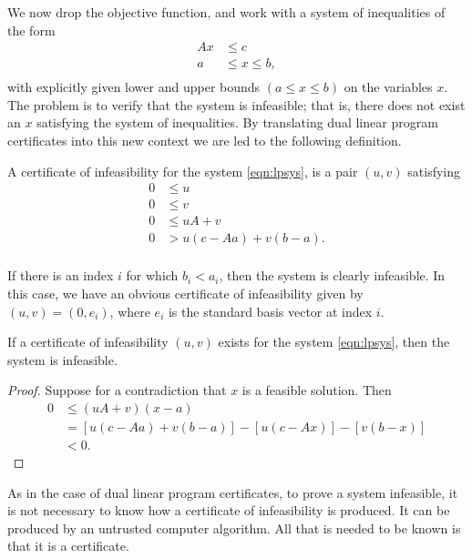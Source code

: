 We now drop the objective function, and work
with a system of inequalities  of the form
\begin{equation}
\label{eqn:lpsys}
\begin{array}{lll}
A x &\le c\\
a &\le x \le b,\\
\end{array}
\end{equation}
with explicitly given lower and upper bounds $(a\le x\le b)$ on
the variables $x$.  The problem
is to verify that the system is infeasible; that is, there does
not exist an $x$ satisfying the system of inequalities.  By
translating dual linear program certificates into this new context
we are led to the following definition.

\begin{definition}
A certificate of infeasibility for the system \ref{eqn:lpsys},
is a pair $(u,v)$ satisfying
$$
\begin{array}{lll}
0&\le u\\
0&\le v\\
0&\le u A + v\\
0& > u(c-Aa) + v(b-a). \\
\end{array}
$$
\end{definition}

\begin{example}
If there is an index $i$ for which $b_i < a_i$, then the system is
clearly infeasible.  In this case, we have an obvious certificate
of infeasibility given by $(u,v)=(0,e_i)$, where $e_i$ is the
standard basis vector at index $i$.
\end{example}

\begin{lemma}
If a certificate of infeasibility $(u,v)$ exists for the system
\ref{eqn:lpsys}, then the system is infeasible.
\end{lemma}

\begin{proof}
Suppose for a contradiction that $x$ is a feasible solution.
Then
$$
\begin{array}{lll}
0 &\le (u A + v)(x-a) \\
&= [u (c- A a) + v (b- a)] - [u (c - A x)] - [v (b - x)]\\
&< 0.
\end{array}
$$
\end{proof}

As in the case of dual linear program certificates, 
to prove a system infeasible, it is not necessary to know how a
certificate of infeasibility is produced.  It can be produced 
by an untrusted computer algorithm.  All that is needed
to be known is that it is a certificate.

